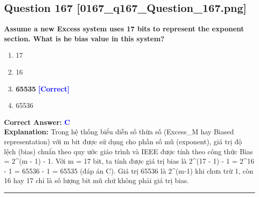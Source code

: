 \documentclass[11pt,a4paper]{article}
\begin{document}
\begin{minipage}{\textwidth}
\subsection*{Question 167 \quad \footnotesize{[0167\_q167\_Question\_167.png]}}
\noindent \textbf{Assume a new Excess system uses 17 bits to represent the exponent section. What is he bias value in this system?}

\begin{enumerate}[label=\Alph*.]
    \item 17
    \item 16
    \item \textbf{65535} \hfill \textcolor{blue}{\textbf{[Correct]}}
    \item 65536
\end{enumerate}

\noindent \textbf{Correct Answer:} \textcolor{blue}{\textbf{C}} \\[2pt]
\noindent \textbf{Explanation:} Trong hệ thống biểu diễn số thừa số (Excess\_M hay Biased representation) với m bit được sử dụng cho phần số mũ (exponent), giá trị độ lệch (bias) chuẩn theo quy ước giáo trình và IEEE được tính theo công thức Bias = 2\textasciicircum{}(m - 1) - 1. Với m = 17 bit, ta tính được giá trị bias là 2\textasciicircum{}(17 - 1) - 1 = 2\textasciicircum{}16 - 1 = 65536 - 1 = 65535 (đáp án C). Giá trị 65536 là 2\textasciicircum{}(m-1) khi chưa trừ 1, còn 16 hay 17 chỉ là số lượng bit mũ chứ không phải giá trị bias.

\par\vspace{0.3cm}
\hrule
\vspace{0.3cm}
\end{minipage}
\end{document}
